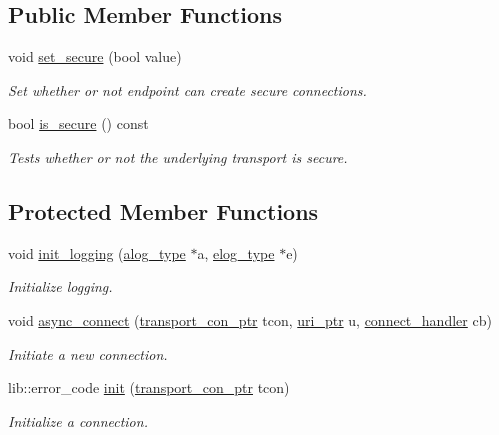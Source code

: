 \subsection*{Public Member Functions}
\begin{DoxyCompactItemize}
\item 
void \hyperlink{classwebsocketpp_1_1transport_1_1stub_1_1endpoint_a5e7ffca4157517d74c6f433e016f05e8}{set\+\_\+secure} (bool value)
\begin{DoxyCompactList}\small\item\em Set whether or not endpoint can create secure connections. \end{DoxyCompactList}\item 
bool \hyperlink{classwebsocketpp_1_1transport_1_1stub_1_1endpoint_a57f9ac746c580cacc374b49889e514f7}{is\+\_\+secure} () const
\begin{DoxyCompactList}\small\item\em Tests whether or not the underlying transport is secure. \end{DoxyCompactList}\end{DoxyCompactItemize}
\subsection*{Protected Member Functions}
\begin{DoxyCompactItemize}
\item 
void \hyperlink{classwebsocketpp_1_1transport_1_1stub_1_1endpoint_ad64a58ebd03fe9e55d19ec8d27bcaac9}{init\+\_\+logging} (\hyperlink{classwebsocketpp_1_1transport_1_1stub_1_1endpoint_aa62a4dd626d9b8757972c0ef66e72419}{alog\+\_\+type} $\ast$a, \hyperlink{classwebsocketpp_1_1transport_1_1stub_1_1endpoint_a7890584ddff40571589f62c52bc5b080}{elog\+\_\+type} $\ast$e)
\begin{DoxyCompactList}\small\item\em Initialize logging. \end{DoxyCompactList}\item 
void \hyperlink{classwebsocketpp_1_1transport_1_1stub_1_1endpoint_ad912ae8113d6c879fab22daaeba964b9}{async\+\_\+connect} (\hyperlink{classwebsocketpp_1_1transport_1_1stub_1_1endpoint_af2bad83f2577d578712642e11767efe1}{transport\+\_\+con\+\_\+ptr} tcon, \hyperlink{namespacewebsocketpp_aae370ea5ac83a8ece7712cb39fc23f5b}{uri\+\_\+ptr} u, \hyperlink{namespacewebsocketpp_1_1transport_ac392fca34e946b48414278c0c3addfa5}{connect\+\_\+handler} cb)
\begin{DoxyCompactList}\small\item\em Initiate a new connection. \end{DoxyCompactList}\item 
lib\+::error\+\_\+code \hyperlink{classwebsocketpp_1_1transport_1_1stub_1_1endpoint_a9931019b90c1e7b162d9fb7d39d5b3a2}{init} (\hyperlink{classwebsocketpp_1_1transport_1_1stub_1_1endpoint_af2bad83f2577d578712642e11767efe1}{transport\+\_\+con\+\_\+ptr} tcon)
\begin{DoxyCompactList}\small\item\em Initialize a connection. \end{DoxyCompactList}\end{DoxyCompactItemize}


